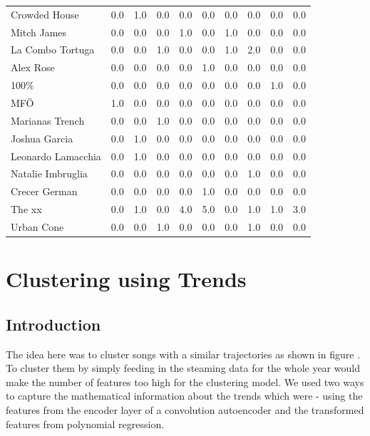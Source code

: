 \begin{appendix}
\begin{table}[h]
\begin{tabular}{|l|r|r|r|r|r|r|r|r|r|}
Crowded House             &  0.0 &  1.0 &  0.0 &  0.0 &  0.0 &  0.0 &  0.0 &  0.0 &  0.0 \\
Mitch James               &  0.0 &  0.0 &  0.0 &  1.0 &  0.0 &  1.0 &  0.0 &  0.0 &  0.0 \\
La Combo Tortuga          &  0.0 &  0.0 &  1.0 &  0.0 &  0.0 &  1.0 &  2.0 &  0.0 &  0.0 \\
Alex Rose                 &  0.0 &  0.0 &  0.0 &  0.0 &  1.0 &  0.0 &  0.0 &  0.0 &  0.0 \\
100\%                      &  0.0 &  0.0 &  0.0 &  0.0 &  0.0 &  0.0 &  0.0 &  1.0 &  0.0 \\
MFÖ                       &  1.0 &  0.0 &  0.0 &  0.0 &  0.0 &  0.0 &  0.0 &  0.0 &  0.0 \\
Marianas Trench           &  0.0 &  0.0 &  1.0 &  0.0 &  0.0 &  0.0 &  0.0 &  0.0 &  0.0 \\
Joshua Garcia             &  0.0 &  1.0 &  0.0 &  0.0 &  0.0 &  0.0 &  0.0 &  0.0 &  0.0 \\
Leonardo Lamacchia        &  0.0 &  1.0 &  0.0 &  0.0 &  0.0 &  0.0 &  0.0 &  0.0 &  0.0 \\
Natalie Imbruglia         &  0.0 &  0.0 &  0.0 &  0.0 &  0.0 &  0.0 &  1.0 &  0.0 &  0.0 \\
Crecer German             &  0.0 &  0.0 &  0.0 &  0.0 &  1.0 &  0.0 &  0.0 &  0.0 &  0.0 \\
The xx                    &  0.0 &  1.0 &  0.0 &  4.0 &  5.0 &  0.0 &  1.0 &  1.0 &  3.0 \\
Urban Cone                &  0.0 &  0.0 &  1.0 &  0.0 &  0.0 &  0.0 &  1.0 &  0.0 &  0.0 \\
\bottomrule
\end{tabular}
\end{table}
\section{Clustering using Trends}
\label{appendix:F}
\subsection{Introduction}
The idea here was to cluster songs with a similar trajectories as shown in figure \label{fig:trendstwosongs}. To cluster them by simply feeding in the steaming data for the whole year would make the number of features too high for the clustering model. We used two ways to capture the mathematical information about the trends which were - using the features from the encoder layer of a convolution autoencoder and the transformed features from polynomial regression. 


\end{appendix}
